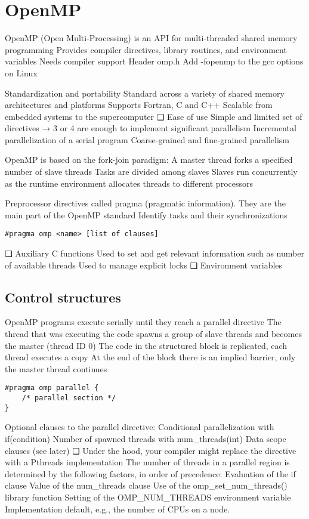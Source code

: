 \section{OpenMP}

OpenMP (Open Multi-Processing) is an API for
multi-threaded shared memory programming
Provides compiler directives, library
routines, and environment variables
Needs compiler support
Header omp.h
Add -fopenmp to the gcc options on Linux


Standardization and portability
Standard across a variety of shared memory
architectures and platforms
Supports Fortran, C and C++
Scalable from embedded systems to the
supercomputer
❑ Ease of use
Simple and limited set of directives → 3 or 4
are enough to implement significant
parallelism
Incremental parallelization of a serial program
Coarse-grained and fine-grained parallelism

OpenMP is based on the fork-join paradigm:
A master thread forks a specified number of
slave threads
Tasks are divided among slaves
Slaves run concurrently as the runtime
environment allocates threads to different
processors

Preprocessor directives called pragma (pragmatic
information).
They are the main part of the OpenMP standard
Identify tasks and their synchronizations
\begin{lstlisting}[style=C]
#pragma omp <name> [list of clauses]
\end{lstlisting}
❑ Auxiliary C functions
Used to set and get relevant information such
as number of available threads
Used to manage explicit locks
❑ Environment variables

\subsection{Control structures}
OpenMP programs execute serially until they reach
a parallel directive
The thread that was executing the code spawns
a group of slave threads and becomes the
master (thread ID 0)
The code in the structured block is replicated,
each thread executes a copy
At the end of the block there is an implied
barrier, only the master thread continues 
\begin{lstlisting}[style=C]
#pragma omp parallel {
    /* parallel section */
}
\end{lstlisting}
Optional clauses to the parallel directive:
Conditional parallelization with if(condition)
Number of spawned threads with
num_threads(int)
Data scope clauses (see later)
❑ Under the hood, your compiler might replace the
directive with a Pthreads implementation 
The number of threads in a parallel region is
determined by the following factors, in order of
precedence:
Evaluation of the if clause
Value of the num_threads clause
Use of the omp_set_num_threads() library
function
Setting of the OMP_NUM_THREADS environment
variable
Implementation default, e.g., the number of
CPUs on a node.

